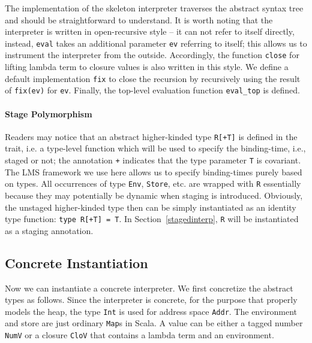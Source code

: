 The implementation of the skeleton interpreter traverses the abstract syntax
tree and should be straightforward to understand. It is worth noting that the
interpreter is written in open-recursive style -- it can not refer to itself
directly, instead, \texttt{eval} takes an additional parameter \texttt{ev}
referring to itself; this allows us to instrument the interpreter from the
outside. Accordingly, the function \texttt{close} for lifting lambda term to
closure values is also written in this style. We define a default implementation
\texttt{fix} to close the recursion by recursively using the result of
\texttt{fix(ev)} for \texttt{ev}. Finally, the top-level evaluation function
\texttt{eval\_top} is defined.

\paragraph{Stage Polymorphism}

Readers may notice that an abstract higher-kinded type \texttt{R[+T]} is defined
in the trait, i.e. a type-level function which will be used to specify the
binding-time, i.e., staged or not; the annotation \texttt{+} indicates that the
type parameter \texttt{T} is covariant. The LMS framework we use here allows us
to specify binding-times purely based on types. All occurrences of type
\texttt{Env}, \texttt{Store}, etc. are wrapped with \texttt{R} essentially
because they may potentially be dynamic when staging is introduced. Obviously,
the unstaged higher-kinded type then can be simply instantiated as an identity
type function: \texttt{type R[+T] = T}. In Section~\ref{stagedinterp},
\texttt{R} will be instantiated as a staging annotation.


\subsection{Concrete Instantiation} \label{unstaged_conc}

Now we can instantiate a concrete interpreter. We first concretize the abstract
types as follows. Since the interpreter is concrete, for the purpose that
properly models the heap, the type \texttt{Int} is used for address space
\texttt{Addr}. The environment and store are just ordinary \texttt{Map}s in
Scala. A value can be either a tagged number \texttt{NumV} or a closure
\texttt{CloV} that contains a lambda term and an environment.

